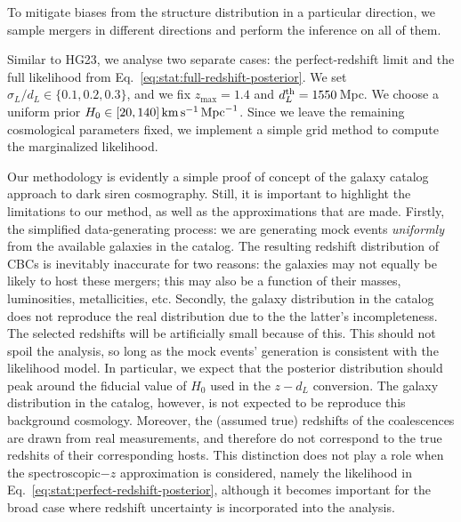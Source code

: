 \documentclass[%
preprint,
nofootinbib,
 amsmath,amssymb,
 aps,
]{revtex4-2}
\begin{document}
To mitigate biases from the structure distribution in a particular direction, we sample mergers in
different directions and perform the inference on all of them.

Similar to HG23, we analyse two separate cases: the perfect-redshift limit and the full likelihood
from Eq.~\eqref{eq:stat:full-redshift-posterior}. We set $\sigma_L / d_L \in \{0.1, 0.2, 0.3\}$,
and we fix $z_\text{max} = 1.4$ and $d_L^{\rm{th}} = 1550 \,$Mpc. We choose a uniform prior $ H_0
	\in [20, 140] \, \rm{km} \, \rm{s}^{-1} \, \rm{Mpc}^{-1}$. Since we leave the remaining
cosmological parameters fixed, we implement a simple grid method to compute the marginalized
likelihood.

Our methodology is evidently a simple proof of concept of the galaxy catalog approach to dark siren
cosmography. Still, it is important to highlight the limitations to our method, as well as the
approximations that are made. Firstly, the simplified data-generating process: we are generating
mock events \textit{uniformly} from the available galaxies in the catalog. The resulting redshift
distribution of CBCs is inevitably inaccurate for two reasons: the galaxies may not equally be
likely to host these mergers; this may also be a function of their masses, luminosities,
metallicities, etc. Secondly, the galaxy distribution in the catalog does not reproduce the real
distribution due to the the latter's incompleteness. The selected redshifts will be artificially
small because of this. This should not spoil the analysis, so long as the mock events' generation
is consistent with the likelihood model. In particular, we expect that the posterior distribution
should peak around the fiducial value of $H_0$ used in the $z-d_L$ conversion. The galaxy
distribution in the catalog, however, is not expected to be reproduce this background cosmology.
Moreover, the (assumed true) redshifts of the coalescences are drawn from real measurements, and
therefore do not correspond to the true redshits of their corresponding hosts. This distinction
does not play a role when the spectroscopic$-z$ approximation is considered, namely the likelihood
in Eq.~\eqref{eq:stat:perfect-redshift-posterior}, although it becomes important for the broad case
where redshift uncertainty is incorporated into the analysis.
\end{document}
